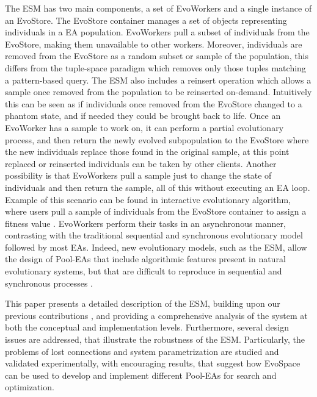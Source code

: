 The ESM has two main components, a set of EvoWorkers and a single instance of an EvoStore. The EvoStore container manages a set of objects representing individuals in a EA population. EvoWorkers pull a subset of individuals from the EvoStore, making them unavailable to other workers. Moreover, individuals are removed from the EvoStore as a random subset or sample of the population, this differs from the tuple-space paradigm which removes only those tuples matching a pattern-based query. The ESM also includes a reinsert operation which allows a sample once removed from the population to be reinserted on-demand. Intuitively this can be seen as if individuals once removed from the EvoStore changed to a phantom state, and if needed they could be brought back to life. Once an EvoWorker has a sample to work on, it can perform a partial evolutionary process, and then return the newly evolved subpopulation to the EvoStore where the new individuals replace those found in the original sample, at this point replaced or reinserted individuals can be taken by other clients. Another possibility is that  EvoWorkers pull a sample just to change the state of individuals and then return the sample, all of this without executing an EA loop. Example of this scenario can be found in interactive evolutionary algorithm, where users pull a sample of individuals from the EvoStore container to assign a fitness value \cite{Musart,Fire}.  
EvoWorkers perform their tasks in an asynchronous manner, contrasting with the traditional sequential and synchronous evolutionary model followed by most EAs. Indeed, new evolutionary models, such as the ESM, allow the design of Pool-EAs that include algorithmic features present in natural evolutionary systems, but that are difficult to reproduce in sequential and synchronous processes \cite{eiben}.

This paper presents a detailed description of the ESM, building upon our previous contributions \cite{Evospace,FreeLunch},
and providing a comprehensive analysis of the system at both the
conceptual and implementation levels.
Furthermore, several design issues are addressed, that illustrate the robustness of the ESM.
Particularly, the problems of lost connections and system parametrization are studied and validated experimentally, with
encouraging results, that suggest how EvoSpace can be used to develop and implement different Pool-EAs for search and optimization.

%
%

